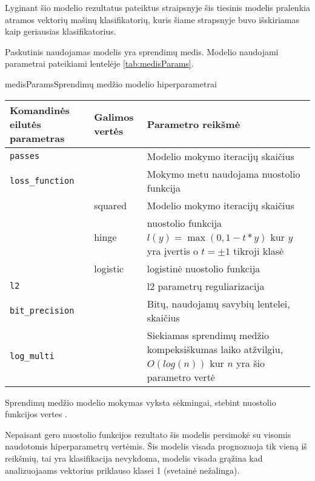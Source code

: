 
Lyginant šio modelio rezultatus pateiktus \cite{comp} straipsnyje šis tiesinis modelis pralenkia
atramos vektorių mašinų klasifikatorių, kuris šiame strapsnyje buvo išskiriamas kaip geriausias klasifikatorius.



Paskutinis naudojamas modelis yra sprendimų medis. Modelio naudojami parametrai pateikiami lentelėje \vref{tab:medisParams}.

\begin{ktutable}{medisParams}{Sprendimų medžio modelio hiperparametrai}
    \begin{tabular}{| l | l | p{7cm}|}
    \hline
        Komandinės eilutės parametras & Galimos vertės & Parametro reikšmė\\ \hline
        \texttt{passes} &  & Modelio mokymo iteracijų skaičius \\ \hline
        \texttt{loss\_function} &          & Mokymo metu naudojama nuostolio funkcija \\
                               & squared  & Modelio mokymo iteracijų skaičius \\
                               & hinge    & nuostolio funkcija $l(y) = \max(0, 1 - t * y)$ kur $y$ yra įvertis o $t = \pm 1$ tikroji klasė  \\
                               & logistic & logistinė nuostolio funkcija \\ \hline
        \texttt{l2} & & l2 parametrų reguliarizacija \\ \hline
        \texttt{bit\_precision} & & Bitų, naudojamų savybių lentelei, skaičius\\ \hline
        \texttt{log\_multi} & & Siekiamas sprendimų medžio kompeksiškumas laiko atžvilgiu, $O(log(n))$ kur $n$ yra šio parametro vertė\\ \hline
    \end{tabular}
\end{ktutable}

Sprendimų medžio modelio mokymas vyksta sėkmingai, stebint nuostolio funkcijos vertes .

Nepaisant gero nuostolio funkcijos rezultato šis modelis persimokė su visomis naudotomis
hiperparametrų vertėmis. Šis modelis visada prognozuoja tik vieną iš reikšmių, tai yra
klasifikacija nevykdoma, modelis visada grąžina kad analizuojaams vektorius priklauso klasei 1 (svetainė nežalinga).

